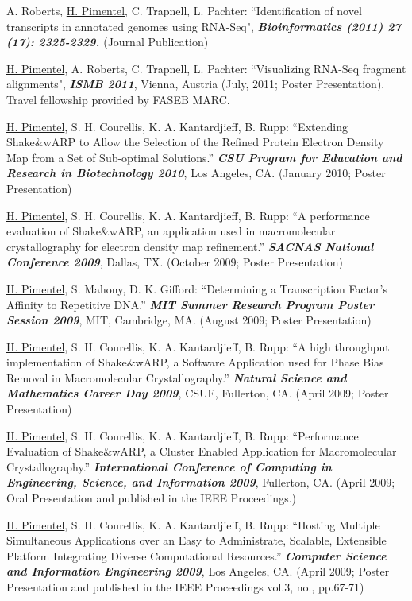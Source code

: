 \documentclass[margin,line]{res}
\begin{document}
\begin{resume}
A. Roberts, \underline{H. Pimentel}, C. Trapnell, L. Pachter: ``Identification
of novel transcripts in annotated genomes using RNA-Seq", {\bf
  \emph{Bioinformatics (2011) 27 (17): 2325-2329.}} (Journal Publication)

\newpage

\underline{H. Pimentel}, A. Roberts, C. Trapnell, L. Pachter: ``Visualizing
RNA-Seq fragment alignments", {\bf \emph{ISMB 2011}}, Vienna, Austria (July,
2011; Poster Presentation). Travel fellowship provided by FASEB MARC.

\underline{H. Pimentel}, S. H. Courellis, K. A. Kantardjieff, B. Rupp:
``Extending Shake\&wARP to Allow the Selection of the Refined Protein Electron
Density Map from a Set of Sub-optimal Solutions.'' {\bf \emph{CSU Program for
    Education and Research in Biotechnology 2010}}, Los Angeles, CA. (January
2010; Poster Presentation)

\underline{H. Pimentel}, S. H. Courellis, K. A. Kantardjieff, B. Rupp: ``A
performance evaluation of Shake\&wARP, an application used in macromolecular
crystallography for electron density map refinement.''  {\bf \emph{SACNAS
    National Conference 2009}}, Dallas, TX. (October 2009; Poster Presentation)

\underline{H. Pimentel}, S. Mahony, D. K. Gifford: ``Determining a
Transcription Factor's Affinity to Repetitive DNA.'' {\bf \emph{MIT
    Summer Research Program Poster Session 2009}}, MIT, Cambridge,
MA. (August 2009; Poster Presentation)

\underline{H. Pimentel}, S. H. Courellis, K. A. Kantardjieff, B. Rupp: ``A high
throughput implementation of Shake\&wARP, a Software Application used for Phase
Bias Removal in Macromolecular Crystallography.'' {\bf \emph{Natural Science and
    Mathematics Career Day 2009}}, CSUF, Fullerton, CA. (April 2009; Poster
Presentation)

\underline{H. Pimentel}, S. H. Courellis, K. A. Kantardjieff, B. Rupp:
``Performance Evaluation of Shake\&wARP, a Cluster Enabled Application for
Macromolecular Crystallography.'' {\bf \emph{International Conference of
    Computing in Engineering, Science, and Information
    2009}}, Fullerton, CA. (April 2009; Oral Presentation and published in the
         IEEE Proceedings.)

\underline{H. Pimentel}, S. H. Courellis, K. A. Kantardjieff, B. Rupp:
``Hosting Multiple Simultaneous Applications over an Easy to
Administrate, Scalable, Extensible Platform Integrating Diverse
Computational Resources.'' {\bf \emph{Computer Science and Information
    Engineering 2009}}, Los Angeles,
CA. (April 2009; Poster Presentation and published in the
IEEE Proceedings vol.3, no., pp.67-71)



\end{resume}
\end{document}
